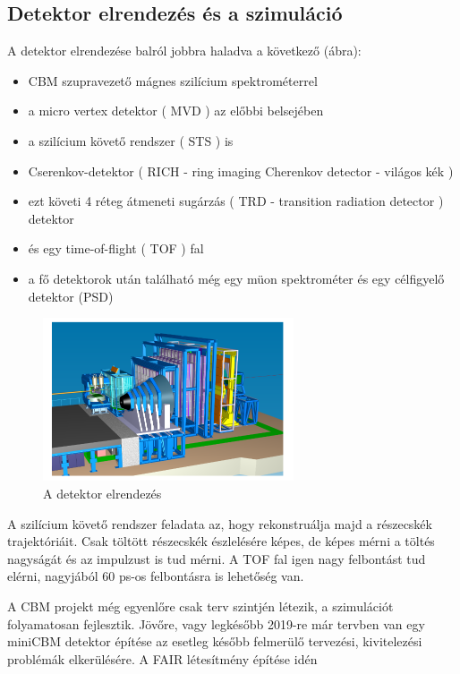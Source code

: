 \documentclass[a4paper,12pt]{article}
\begin{document}
\subsection{ Detektor elrendezés és a szimuláció}
\par A detektor elrendezése balról jobbra haladva a következő (ábra):
\begin{itemize}
	\item CBM szupravezető mágnes szilícium spektrométerrel
	\item a micro vertex detektor ( MVD ) az előbbi belsejében
	\item a szilícium követő rendszer ( STS ) is
	\item Cserenkov-detektor ( RICH - ring imaging Cherenkov detector - világos kék )
	\item ezt követi 4 réteg átmeneti sugárzás ( TRD - transition radiation detector ) detektor
	\item és egy time-of-flight ( TOF ) fal
	\item a fő detektorok után található még egy müon spektrométer és egy célfigyelő detektor (PSD)  
\end{itemize}
\begin{figure}[H]
	\centering
	\includegraphics[width=0.66\textwidth]{cbm_detector.png}
	\caption{ A detektor elrendezés }
\end{figure}
\par A szilícium követő rendszer feladata az, hogy rekonstruálja majd a részecskék trajektóriáit. Csak töltött részecskék észlelésére képes, 
de képes mérni a töltés nagyságát és az impulzust is tud mérni. A TOF fal igen nagy felbontást tud elérni, nagyjából 60 ps-os felbontásra is
lehetőség van.
\vspace{5mm}
\par A CBM projekt még egyenlőre csak terv szintjén létezik, a szimulációt folyamatosan fejlesztik. Jövőre, vagy legkésőbb 2019-re már tervben 
van egy miniCBM detektor építése az esetleg később felmerülő tervezési, kivitelezési problémák elkerülésére. A FAIR létesítmény építése idén 
\end{document}

